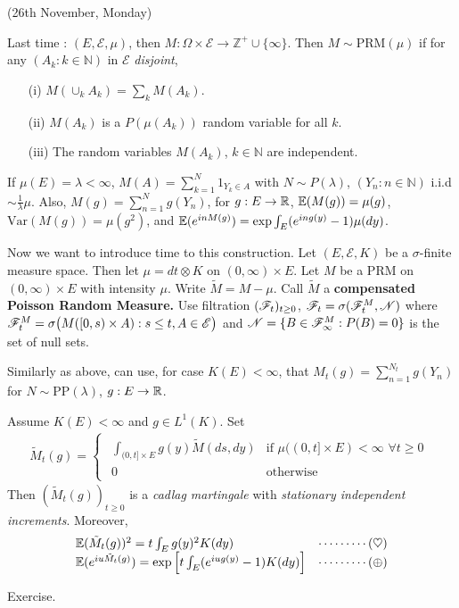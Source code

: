 \documentclass[12pt,a4paper]{report}
\newenvironment{proof}
{\begin{changemargin}{1cm}{0.5cm} 
	}%
	{\end{changemargin}
}
\begin{document}
\newday

(26th November, Monday)
\s

Last time : $(E,\mathscr{E},\mu)$, then $M : \Omega \times \mathscr{E} \rightarrow \mathbb{Z}^+ \cup \{\infty\}$. Then $M\sim \text{PRM}(\mu)$ if for any $(A_k : k\in \mathbb{N})$ in $\mathscr{E}$ \emph{disjoint},
\begin{itemize}
\item[(i)] $M(\cup_k A_k) = \sum_k M(A_k)$. 
\item[(ii)] $M(A_k)$ is a $P(\mu(A_k))$ random variable for all $k$.
\item[(iii)] The random variables $M(A_k)$, $k\in \mathbb{N}$ are independent.
\end{itemize}
If $\mu(E) =\lambda < \infty$, $M(A) = \sum_{k=1}^N 1_{Y_k \in A}$ with $N\sim P(\lambda)$, $(Y_n : n\in \mathbb{N})$ i.i.d $\sim \frac{1}{\lambda
}\mu$. Also, $M(g) = \sum_{n=1}^N g(Y_n)$, for $g: E \rightarrow \mathbb{R}$, $\mathbb{E}(M(g)) = \mu(g)$, $\text{Var}(M(g)) = \mu (g^2)$, and $\mathbb{E}(e^{inM(g)}) = \exp \int_E (e^{ing(y)}-1) \mu(dy)$.
\s

Now we want to introduce time to this construction. Let $(E, \mathscr{E} , K)$ be a $\sigma$-finite measure space. Then let $\mu = dt \otimes K$ on $(0, \infty) \times E$. Let $M$ be a $\text{PRM}$ on $(0,\infty) \times E$ with intensity $\mu$. Write $\tilde{M} = M-\mu$. Call $\tilde{M}$ a \textbf{compensated Poisson Random Measure.} Use filtration $(\mathscr{F}_t)_{t\geq 0}$, $\mathscr{F}_t = \sigma (\mathscr{F}_t^M, \mathscr{N})$ where $\mathscr{F}_t^M = \sigma \big( M([0,s) \times A ) : s\leq t, A\in \mathscr{E} \big)$ and $\mathscr{N} = \{B\in \mathscr{F}_{\infty}^M : P(B) =0\}$ is the set of null sets.
\s

Similarly as above, can use, for case $K(E)<\infty$, that $M_t(g) = \sum_{n=1}^{N_t} g(Y_n)$ for $N \sim \text{PP}(\lambda)$, $g: E\rightarrow \mathbb{R}$.
\s

 Assume $K(E) < \infty$ and $g\in L^1(K)$. Set
\begin{align*}
\tilde{M}_t(g) = \begin{cases}
\begin{array}{ll}
\int_{(0,t] \times E} g(y) \tilde{M} (ds,dy) & \text{if }  \mu( (0,t] \times E) < \infty \,\, \forall t\geq 0 \\
0 & \text{otherwise}
\end{array}
\end{cases}
\end{align*}
Then $(\tilde{M}_t(g))_{t\geq 0}$ is a \emph{cadlag martingale} with \emph{stationary independent increments}. Moreover,
\begin{align*}
\begin{array}{ll}
\mathbb{E}(\tilde{M}_t(g))^2 = t\int_E g(y)^2 K(dy) & \cdots\cdots\cdots (\heartsuit) \\
\mathbb{E}(e^{iu\tilde{M}_t(g)}) =\exp\Big[ t\int_E (e^{iug(y)}-1) K(dy) \Big] & \cdots\cdots\cdots (\oplus)
\end{array}
\end{align*}
\begin{proof}
\pf Exercise.
\end{proof}
\s
\end{document}
